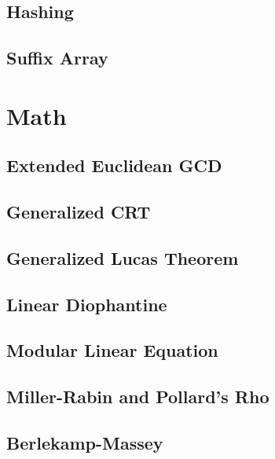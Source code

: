 \subsection{Hashing}

\subsection{Suffix Array}

\section{Math}
\subsection{Extended Euclidean GCD}

\subsection{Generalized CRT}

\subsection{Generalized Lucas Theorem}

\subsection{Linear Diophantine}

\subsection{Modular Linear Equation}

\subsection{Miller-Rabin and Pollard's Rho}

\subsection{Berlekamp-Massey}

